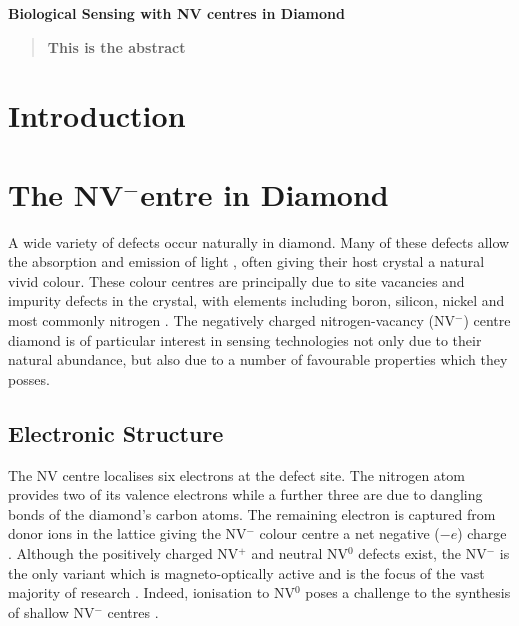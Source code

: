 \documentclass[10pt]{article}
\begin{document}
\LARGE\textbf{Biological Sensing with NV centres in Diamond}
\vspace{0.8cm}

\begin{abstract}
\textbf{This is the abstract}
\end{abstract}


\begin{multicols}{2}
\normalsize
\tableofcontents
\section{Introduction}
\section{The NV\texorpdfstring{$^-$} Centre in Diamond}
A wide variety of defects occur naturally in diamond. Many of these defects allow the absorption and emission of light \cite{zaitsev2001optical}, often giving their host crystal a natural vivid colour. These colour centres are principally due to site vacancies and impurity defects in the crystal, with elements including boron, silicon, nickel and most commonly nitrogen \cite{wu2016diamond}. The negatively charged nitrogen-vacancy (NV$^-$) centre diamond is of particular interest in sensing technologies not only due to their natural abundance, but also due to a number of favourable properties which they posses. 

\subsection{Electronic Structure}
The NV centre localises six electrons at the defect site. The nitrogen atom provides two of its valence electrons while a further three are due to dangling bonds of the diamond's carbon atoms\cite{schirhagl2014nitrogen}. The remaining electron is captured from donor ions in the lattice giving the NV$^-$ colour centre a net negative ($-e$) charge \cite{schirhagl2014nitrogen}. Although the positively charged NV$^+$ and neutral NV$^0$ defects exist, the NV$^-$ is the only variant which is magneto-optically active and is the focus of the vast majority of research \cite{schirhagl2014nitrogen}. Indeed, ionisation to NV$^0$ poses a challenge to the synthesis of shallow NV$^-$ centres \cite{hauf2011chemical}. 



\end{multicols}
\end{document}
